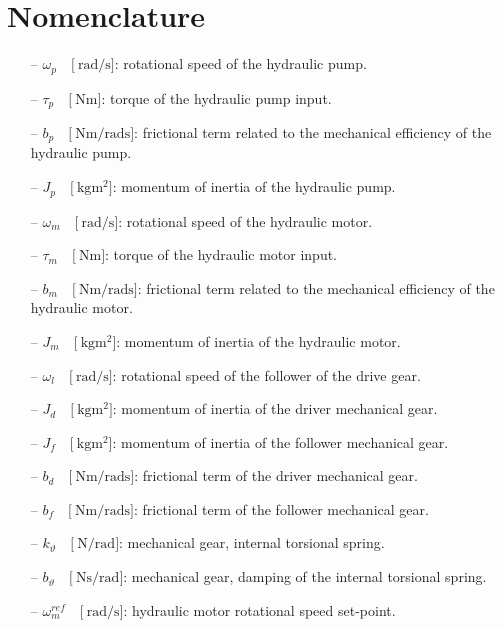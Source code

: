 \documentclass[11pt,a4paper,oneside]{book}
\numberwithin{equation}{section}
\theoremstyle{it}
\theoremstyle{definition}
\begin{document}
	\section{Nomenclature}
	\begin{itemize}
		\item[--] $\omega_p\quad\Big[\SI{}{\radian\per\second}\Big]$: rotational speed of the hydraulic pump.
		\item[--] $\tau_p\quad\Big[\SI{}{\newton\meter}\Big]$: torque of the hydraulic pump input.
		\item[--] $b_p\quad\Big[\SI{}{\newton\meter\per\radian\second}\Big]$: frictional term related to the mechanical efficiency of the hydraulic pump.
		\item[--] $J_p\quad\Big[\SI{}{\kilogram\square\meter}\Big]$: momentum of inertia of the hydraulic pump.
		\item[--] $\omega_m\quad\Big[\SI{}{\radian\per\second}\Big]$: rotational speed of the hydraulic motor.
		\item[--] $\tau_m\quad\Big[\SI{}{\newton\meter}\Big]$: torque of the hydraulic motor input.
		\item[--] $b_m\quad\Big[\SI{}{\newton\meter\per\radian\second}\Big]$: frictional term related to the mechanical efficiency of the hydraulic motor.
		\item[--] $J_m\quad\Big[\SI{}{\kilogram\square\meter}\Big]$: momentum of inertia of the hydraulic motor.
		\item[--] $\omega_l\quad\Big[\SI{}{\radian\per\second}\Big]$: rotational speed of the follower of the drive gear.
		\item[--] $J_{d}\quad\Big[\SI{}{\kilogram\square\meter}\Big]$: momentum of inertia of the driver mechanical gear.
		\item[--] $J_{f}\quad\Big[\SI{}{\kilogram\square\meter}\Big]$: momentum of inertia of the follower mechanical gear.
		\item[--] $b_{d}\quad\Big[\SI{}{\newton\meter\per\radian\second}\Big]$: frictional term of the driver mechanical gear.
		\item[--] $b_{f}\quad\Big[\SI{}{\newton\meter\per\radian\second}\Big]$: frictional term of the follower mechanical gear.
		\item[--] $k_\vartheta\quad\Big[\SI{}{\newton\per\radian}\Big]$: mechanical gear, internal torsional spring.	
		\item[--] $b_\vartheta\quad\Big[\SI{}{\newton\second\per\radian}\Big]$: mechanical gear, damping of the internal torsional spring.		
		\item[--] $\omega_m^{ref}\quad\Big[\SI{}{\radian\per\second}\Big]$: hydraulic motor rotational speed set-point.

\end{itemize}
\end{document}
